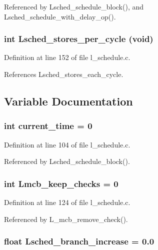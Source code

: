 Referenced by Lsched\_\-schedule\_\-block(), and Lsched\_\-schedule\_\-with\_\-delay\_\-op().
\subsubsection{\setlength{\rightskip}{0pt plus 5cm}int Lsched\_\-stores\_\-per\_\-cycle (void)}\label{l__schedule_8c_5a7ad0e9648a9f387c0d7421d2f55947}




Definition at line 152 of file l\_\-schedule.c.

References Lsched\_\-stores\_\-each\_\-cycle.

\subsection{Variable Documentation}
\subsubsection{\setlength{\rightskip}{0pt plus 5cm}int \bf{current\_\-time} = 0}\label{l__schedule_8c_8915224642e155ba06d1682e27c56c41}




Definition at line 104 of file l\_\-schedule.c.

Referenced by Lsched\_\-schedule\_\-block().
\subsubsection{\setlength{\rightskip}{0pt plus 5cm}int \bf{Lmcb\_\-keep\_\-checks} = 0}\label{l__schedule_8c_7fa8b9ab156b1588456d5055d2d2633f}




Definition at line 124 of file l\_\-schedule.c.

Referenced by L\_\-mcb\_\-remove\_\-check().
\subsubsection{\setlength{\rightskip}{0pt plus 5cm}float \bf{Lsched\_\-branch\_\-increase} = 0.0}\label{l__schedule_8c_426e0448adb8542b89a2e698d6020bb2}




